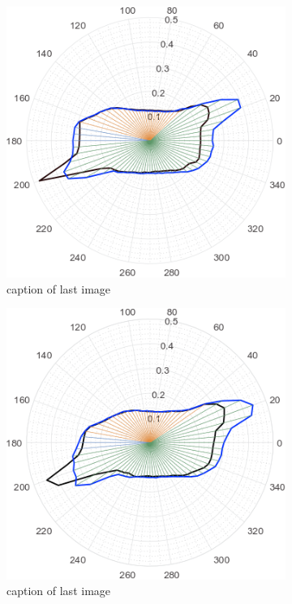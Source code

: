 \begin{figure}
\begin{subfigure}[t]{0.49\textwidth}
    \centering
        \includegraphics[width=0.8\linewidth]{STYLESTUFF/round02.png}
    \caption{caption of last image} 
    \end{subfigure}
    \begin{subfigure}[t]{0.49\textwidth}
     \centering
        \includegraphics[width=0.8\linewidth]{STYLESTUFF/round03.png}
    \caption{caption of last image} 
    \end{subfigure}
     \par\bigskip
    \begin{subfigure}[t]{0.49\textwidth}
     \centering

\end{subfigure}
\end{figure}
